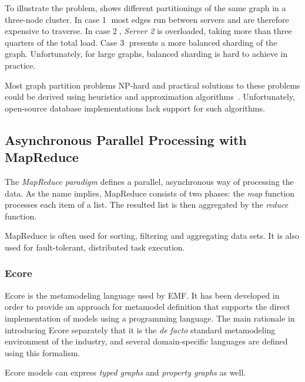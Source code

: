 To illustrate the problem,  shows different partitionings of the same graph in a three-node cluster.  
In case \textcircled{1} most edges run between servers and are therefore expensive to traverse.
In case \textcircled{2}, \emph{Server 2} is overloaded, taking more than three quarters of the total load.
Case \textcircled{3} presents a more balanced sharding of the graph.
Unfortunately, for large graphs, balanced sharding is hard to achieve in practice.

Most graph partition problems NP-hard and practical solutions to these problems could be derived using heuristics and approximation algorithms~\cite{conf/stacs/FeldmannF12}. Unfortunately, open-source database implementations lack support for such algorithms.

\subsection{Asynchronous Parallel Processing with MapReduce}

The \emph{MapReduce paradigm} defines a parallel, asynchronous way of processing the data. As the name implies, MapReduce consists of two phases: the \emph{map} function processes each item of a list. The resulted list is then aggregated by the \emph{reduce} function.

MapReduce is often used for sorting, filtering and aggregating data sets. It is also used for fault-tolerant, distributed task execution.










\subsubsection{Ecore}
\label{ecore}

Ecore is the metamodeling language used by EMF. It has been developed in order to provide an approach for metamodel definition that supports the direct implementation of models using a programming language. The main rationale in introducing Ecore separately that it is the \emph{de facto} standard metamodeling environment of the industry, and several domain-specific languages are defined using this formalism.

Ecore models can express \emph{typed graphs} and \emph{property graphs} as well.


